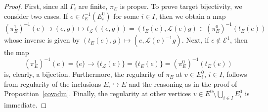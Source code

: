\documentclass[12pt,times,a4paper]{amsart}
\numberwithin{equation}{section}
\numberwithin{equation}{section}
\begin{document}
 \begin{proof}
First, since all $\Gamma_i$ are finite, $\pi_E$ is proper. 
To prove target bijectivity, we consider two cases. If $e\in t_E^{-1}(E_i^0)$ for some $i\in I$, then we obtain a map
\begin{equation}
(\pi^1_E)^{-1}(e)\ni (e,g)\longmapsto t_\mathcal{L}((e,g))=(t_E(e),\mathcal{L}(e)g)\in (\pi^0_E)^{-1}(t_E(e))
\end{equation}
whose inverse is given by $(t_E(e),g)\mapsto (e,\mathcal{L}(e)^{-1}g)$. Next, if $e\notin\mathcal{E}^1$, then the map
\begin{equation}
(\pi^1_E)^{-1}(e)=\{e\}\longrightarrow \{t_\mathcal{L}(e)\}=\{t_E(e)\}=(\pi^0_E)^{-1}(t_E(e))
\end{equation}
is, clearly, a bijection.
Furthermore, the regularity of $\pi_E$ at $v\in E^0_i$, $i\in I$, follows from regularity of the inclusions $E_i\hookrightarrow E$ and the reasoning as in 
the proof of Proposition~\ref{covadm}. Finally, the regularity at other vertices $v\in E^0\setminus\bigcup_{i\in I}E^0_i$ is immediate.
\end{proof}
\end{document}
